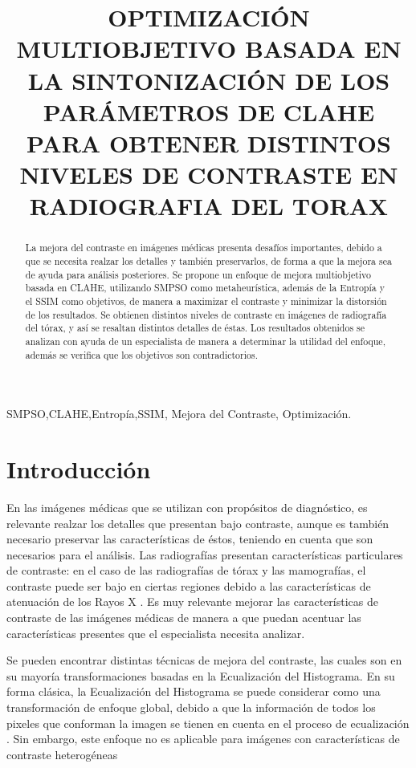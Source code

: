 \documentclass[spanish]{article}
\title{OPTIMIZACIÓN MULTIOBJETIVO BASADA EN LA SINTONIZACIÓN DE LOS PARÁMETROS DE CLAHE PARA OBTENER DISTINTOS NIVELES DE CONTRASTE EN RADIOGRAFIA DEL TORAX}
\begin{document}
%
\maketitle
%
\begin{abstract}
La mejora del contraste en imágenes médicas presenta desafíos importantes, debido a que se necesita realzar los detalles y también preservarlos, de forma a que la mejora sea de ayuda para análisis posteriores. Se propone un enfoque de mejora multiobjetivo basada en CLAHE, utilizando SMPSO como metaheurística, además de la Entropía y el SSIM como objetivos, de manera a maximizar el contraste y minimizar la distorsión de los resultados. Se obtienen distintos niveles de contraste en imágenes de radiografía del tórax, y así se resaltan distintos detalles de éstas. Los resultados obtenidos se analizan con ayuda de un especialista de manera a determinar la utilidad del enfoque, además se verifica que los objetivos son contradictorios.
\end{abstract}
%
\begin{keywords}
SMPSO,CLAHE,Entropía,SSIM, Mejora del Contraste, Optimización.
\end{keywords}
%
\section{Introducción}
\label{sec:intro}

En las imágenes médicas que se utilizan con propósitos de diagnóstico, es relevante realzar los detalles que presentan bajo contraste, aunque es también necesario preservar las características de éstos, teniendo en cuenta que son necesarios para el análisis. Las radiografías presentan características particulares de contraste: en el caso de las radiografías de tórax y las mamografías, el contraste puede ser bajo en ciertas regiones debido a las características de atenuación de los Rayos X \cite{chang1998image}. Es muy relevante mejorar las características de contraste de las imágenes médicas de manera a que puedan acentuar las características presentes que el especialista necesita analizar.

Se pueden encontrar distintas técnicas de mejora del contraste, las cuales son en su mayoría transformaciones basadas en la Ecualización del Histograma\cite{russ2010image}. En su forma clásica, la Ecualización del Histograma se puede considerar como una transformación de enfoque global, debido a que la información de todos los pixeles que conforman la imagen se tienen en cuenta en el proceso de ecualización \cite{1419470}. Sin embargo, este enfoque no es aplicable para imágenes con características de contraste heterogéneas 
\end{document}

